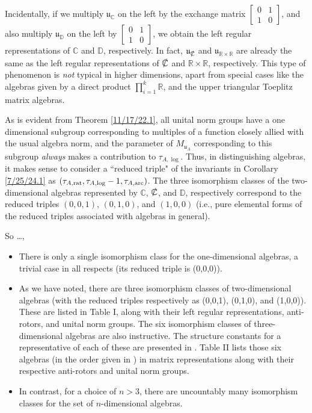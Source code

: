 \documentclass{amsart}
\numberwithin{equation}{section}
\theoremstyle{definition}
\numberwithin{theorem}{section}
\begin{document}
Incidentally, if we multiply $\mathfrak{u}_{\mathbb{C}}$ on the left by the exchange matrix $\left[\begin{array}{ccc}
 0 & 1   \\ 
 1 & 0    
\end{array}\right]$, and also multiply $\mathfrak{u}_{\mathbb{D}}$ on the left by $\left[\begin{array}{ccc}
 0 & 1   \\ 
 1 & 0    
\end{array}\right]$, we obtain the left regular representations of $\mathbb{C}$ and $\mathbb{D}$, respectively.   In fact, $\mathfrak{u}_{\slashed{\mathbb{C}}}$ and $\mathfrak{u}_{\mathbb{R}\times\mathbb{R}}$ are already the same as the left regular representations of $\slashed{\mathbb{C}}$ and $\mathbb{R}\times\mathbb{R}$, respectively.  This type of phenomenon is {\it not} typical in higher dimensions, apart from special cases like the algebras given by a direct product $\prod_{i=1}^k \mathbb{R}$, and the upper triangular Toeplitz matrix algebras.

As is evident from Theorem \ref{11/17/22.1}, all unital norm groups have a one dimensional subgroup corresponding to multiples of a function closely allied with the usual algebra norm, and the parameter of $M_{\mathfrak{u}_A}$ corresponding to this subgroup {\it always} makes a contribution to $\tau_{A,\log}$.  Thus, in distinguishing algebras, it makes sense to consider a ``reduced triple" of the invariants in Corollary \ref{7/25/24.1} as $(\tau_{A,{\rm rat}},\tau_{A,{\rm log}}-1,\tau_{A,{\rm arc}})$. 
 The three isomorphism classes of the two-dimensional algebras represented by $\mathbb{C}$, $\slashed{\mathbb{C}}$, and $\mathbb{D}$, respectively correspond to the reduced triples  $(0,0,1)$, $(0,1,0)$, and $(1,0,0)$ (i.e., pure elemental forms of the reduced triples associated with algebras in general).  
 
 
 
 So \dots,
 
 \begin{itemize}
\item There is only a single isomorphism class for the one-dimensional algebras, a trivial case in all respects (its reduced triple is (0,0,0)).
\item
As we have noted, there are three isomorphism classes of two-dimensional algebras (with the reduced triples respectively as (0,0,1), (0,1,0), and (1,0,0)). These are listed in Table I, along with their left regular representations, anti-rotors, and unital norm groups. 
The six isomorphism classes of three-dimensional algebras are also instructive.  The structure constants for a representative of each of these are presented in \cite{kobayashi:2021}.  Table II lists those six algebras (in the order given in \cite{kobayashi:2021}) in matrix representations along with their respective anti-rotors and unital norm groups. 
\item 
In contrast, for a choice of $n>3$, there are uncountably many isomorphism classes for the set of $n$-dimensional algebras.
\end{itemize}
\end{document}

